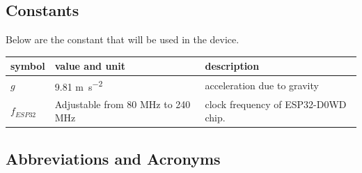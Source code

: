 \documentclass[12pt]{article}
\begin{document}
\subsection{Constants}
Below are the constant that will be used in the device.
\renewcommand{\arraystretch}{1.2}
\begin{table}[H]
	\caption{\label{const}Table of Constants} 
	\noindent \begin{longtable*}{l l p{8cm}} \toprule
	
	\textbf{symbol} & \textbf{value and unit} & \textbf{description}\\
	\midrule
	$g$ & 9.81 \si{\metre\per\square\second} & acceleration due to gravity\\
	$f_{ESP32}$ & Adjustable from 80 \si{MHz} to 240 \si{MHz} & clock frequency of ESP32-D0WD chip.\\
	\bottomrule
	\end{longtable*}

\end{table}

\subsection{Abbreviations and Acronyms}
\end{document}
